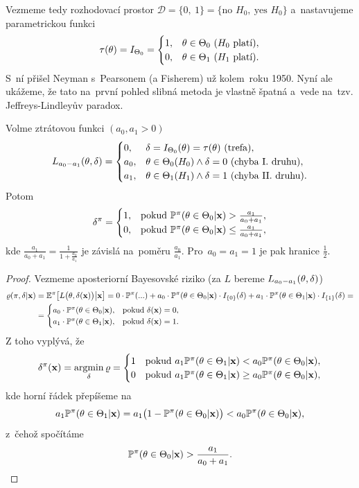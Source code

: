 Vezmeme tedy rozhodovací prostor $\mathscr{D}=\{0,~1\}=\{\text{no }H_0,~\text{yes }H_0\}$ a~nastavujeme parametrickou funkci
$$ \tau(\theta)=I_{\Theta_0}=\begin{cases}
1,& \theta\in\Theta_0~(H_0\text{ platí}),\\0,& \theta\in\Theta_1~(H_1\text{ platí}).
\end{cases}$$ S~ní přišel Neyman s~Pearsonem (a Fisherem) už kolem~roku 1950. Nyní ale ukážeme, že tato na~první pohled slibná metoda je vlastně špatná a~vede na~tzv. Jeffreys-Lindleyův paradox. 
\begin{theorem}
	Volme ztrátovou funkci $(a_0,a_1>0)$ $$L_{a_0-a_1}(\theta,\delta)=\begin{cases}
	0,&\delta=I_{\Theta_0}(\theta)=\tau(\theta)~(\text{trefa}),\\a_0,& \theta\in\Theta_0(H_0)\wedge \delta=0~(\text{chyba I. druhu}),\\a_1,& \theta\in\Theta_1(H_1)\wedge \delta=1~(\text{chyba II. druhu}).
	\end{cases}$$
	Potom $$\delta^\pi=\begin{cases}
	1,& \text{pokud }\mathbb{P}^\pi(\theta\in\Theta_0|\textbf{x})>\frac{a_1}{a_0+a_1},\\
	0,& \text{pokud }\mathbb{P}^\pi(\theta\in\Theta_0|\textbf{x})\leq\frac{a_1}{a_0+a_1},
	\end{cases}$$ kde $\frac{a_1}{a_0+a_1}=\frac{1}{1+\frac{a_0}{a_1}}$ je závislá na~poměru $\frac{a_0}{a_1}$. Pro~$a_0=a_1=1$ je pak hranice $\frac{1}{2}$.
	\begin{proof}
		Vezmeme aposteriorní Bayesovské riziko (za $L$ bereme $L_{a_0-a_1}(\theta,\delta)$)
		\[
		\begin{split}
		\varrho(\pi,\delta|\textbf{x})&=\mathbb{E}^\pi\big[L\big(\theta,\delta(\textbf{x})\big)\big| \textbf{x}\big]=0\cdot\mathbb{P}^{\pi}(...)+a_0\cdot \mathbb{P}^\pi(\theta\in\Theta_0|\textbf{x})\cdot I_{\{0\}}(\delta)+a_1 \cdot\mathbb{P}^\pi (\theta\in\Theta_1|\textbf{x})\cdot I_{\{1\}}(\delta)=\\&=\begin{cases}
		a_0\cdot \mathbb{P}^\pi(\theta\in\Theta_0|\textbf{x}),&\text{pokud }\delta(\textbf{x})=0,\\
		a_1\cdot \mathbb{P}^\pi(\theta\in\Theta_1|\textbf{x}),&\text{pokud }\delta(\textbf{x})=1.
		\end{cases}
		\end{split}
		\]
		Z toho vyplývá, že
		$$ \delta^\pi(\textbf{x})=\mathop{\mathrm{argmin}}_\delta \varrho=\begin{cases}
		1&\text{pokud }a_1\mathbb{P}^\pi(\theta\in\Theta_1|\textbf{x})<a_0\mathbb{P}^\pi(\theta\in\Theta_0|\textbf{x}),\\
		0&\text{pokud }a_1\mathbb{P}^\pi(\theta\in\Theta_1|\textbf{x})\geq a_0\mathbb{P}^\pi(\theta\in\Theta_0|\textbf{x}),\\
		\end{cases} $$
		kde horní řádek přepíšeme na~$$a_1\mathbb{P}^\pi(\theta\in\Theta_1|\textbf{x})=a_1\big(1-\mathbb{P}^\pi(\theta\in\Theta_0|\textbf{x})\big)<a_0\mathbb{P}^\pi(\theta\in\Theta_0|\textbf{x}),$$ z~čehož spočítáme $$\mathbb{P}^\pi(\theta\in\Theta_0|\textbf{x})>\frac{a_1}{a_0+a_1}.$$
	\end{proof}
\end{theorem}
